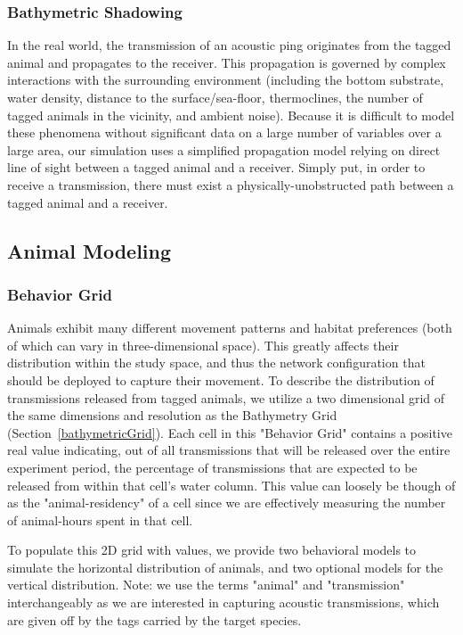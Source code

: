 \subsubsection{Bathymetric Shadowing}
\label{bathymetricShadowing}
In the real world, the transmission of an acoustic ping originates from the tagged animal and propagates to the receiver.  This propagation is governed by complex interactions with the surrounding environment (including the bottom substrate, water density, distance to the surface/sea-floor, thermoclines, the number of tagged animals in the vicinity, and ambient noise).  Because it is difficult to model these phenomena without significant data on a large number of variables over a large area, our simulation uses a simplified propagation model relying on direct line of sight between a tagged animal and a receiver.  Simply put, in order to receive a transmission, there must exist a physically-unobstructed path between a tagged animal and a receiver.  




\subsection{Animal Modeling}
\label{animalModeling}

\subsubsection{Behavior Grid}
\label{behaviorGrid}
Animals exhibit many different movement patterns and habitat preferences (both of which can vary in three-dimensional space).  This greatly affects their distribution within the study space, and thus the network configuration that should be deployed to capture their movement.  To describe the distribution of transmissions released from tagged animals, we utilize a two dimensional grid of the same dimensions and resolution as the Bathymetry Grid (Section~\ref{bathymetricGrid}).  Each cell in this "Behavior Grid" contains a positive real value indicating, out of all transmissions that will be released over the entire experiment period, the percentage of transmissions that are expected to be released from within that cell's water column.  This value can loosely be though of as the "animal-residency" of a cell since we are effectively measuring the number of animal-hours spent in that cell.  

To populate this 2D grid with values, we provide two behavioral models to simulate the horizontal distribution of animals, and two optional models for the vertical distribution.  Note: we use the terms "animal" and "transmission" interchangeably as we are interested in capturing acoustic transmissions, which are given off by the tags carried by the target species.  


